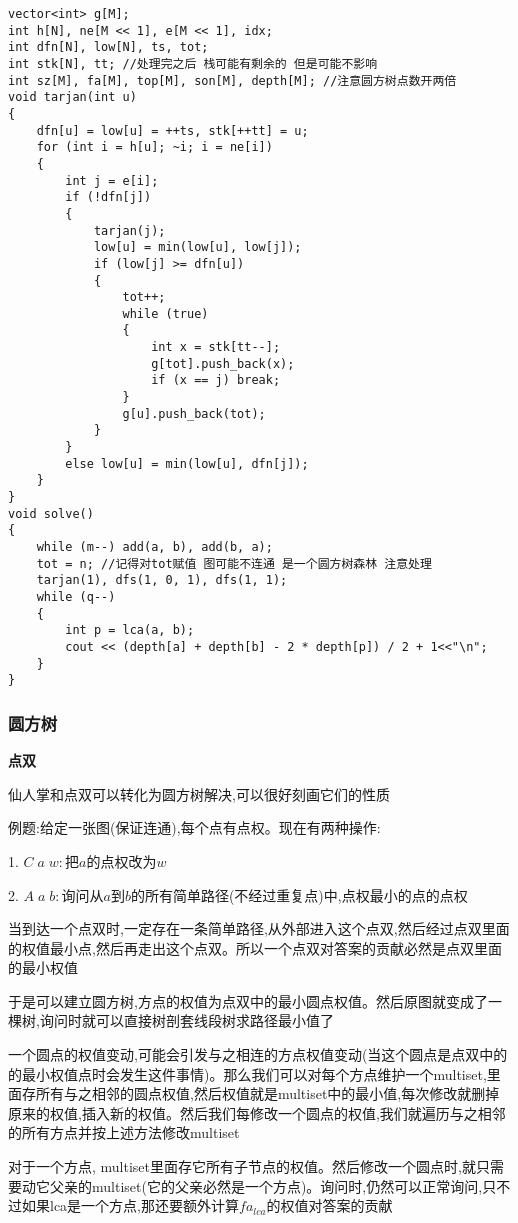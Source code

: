 \documentclass[a4paper, fontset=none]{ctexart}
\begin{document}
\begin{verbatim}
vector<int> g[M];
int h[N], ne[M << 1], e[M << 1], idx;
int dfn[N], low[N], ts, tot;
int stk[N], tt; //处理完之后 栈可能有剩余的 但是可能不影响
int sz[M], fa[M], top[M], son[M], depth[M]; //注意圆方树点数开两倍
void tarjan(int u)
{
    dfn[u] = low[u] = ++ts, stk[++tt] = u;
    for (int i = h[u]; ~i; i = ne[i])
    {
        int j = e[i];
        if (!dfn[j])
        {
            tarjan(j);
            low[u] = min(low[u], low[j]);
            if (low[j] >= dfn[u])
            {
                tot++;
                while (true)
                {
                    int x = stk[tt--];
                    g[tot].push_back(x);
                    if (x == j) break;
                }
                g[u].push_back(tot);
            }
        }
        else low[u] = min(low[u], dfn[j]);
    }
}
void solve()
{
    while (m--) add(a, b), add(b, a);
    tot = n; //记得对tot赋值 图可能不连通 是一个圆方树森林 注意处理
    tarjan(1), dfs(1, 0, 1), dfs(1, 1);
    while (q--)
    {
        int p = lca(a, b);
        cout << (depth[a] + depth[b] - 2 * depth[p]) / 2 + 1<<"\n";
    }
}
\end{verbatim}
\subsubsection{圆方树}

\textbf{点双}

仙人掌和点双可以转化为圆方树解决,可以很好刻画它们的性质

例题:给定一张图(保证连通),每个点有点权。现在有两种操作:

1. $C\;a\;w:$把$a$的点权改为$w$

2. $A\;a\;b:$询问从$a$到$b$的所有简单路径(不经过重复点)中,点权最小的点的点权

当到达一个点双时,一定存在一条简单路径,从外部进入这个点双,然后经过点双里面的权值最小点,然后再走出这个点双。所以一个点双对答案的贡献必然是点双里面的最小权值

于是可以建立圆方树,方点的权值为点双中的最小圆点权值。然后原图就变成了一棵树,询问时就可以直接树剖套线段树求路径最小值了

一个圆点的权值变动,可能会引发与之相连的方点权值变动(当这个圆点是点双中的的最小权值点时会发生这件事情)。那么我们可以对每个方点维护一个multiset,里面存所有与之相邻的圆点权值,然后权值就是multiset中的最小值,每次修改就删掉原来的权值,插入新的权值。然后我们每修改一个圆点的权值,我们就遍历与之相邻的所有方点并按上述方法修改multiset

对于一个方点, multiset里面存它所有子节点的权值。然后修改一个圆点时,就只需要动它父亲的multiset(它的父亲必然是一个方点)。询问时,仍然可以正常询问,只不过如果lca是一个方点,那还要额外计算$fa_{lca}$的权值对答案的贡献
\end{document}
